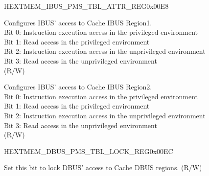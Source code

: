 \begin{register}{H}{EXTMEM\_IBUS\_PMS\_TBL\_ATTR\_REG}{0x00E8}\label{regdesc:EXTMEMIBUSPMSTBLATTRREG}
%
%
%
\regnewline%
\begin{regdesc}\begin{reglist}
\label{fielddesc:EXTMEMIBUSPMSSCT1ATTR}\item [EXTMEM\_IBUS\_PMS\_SCT1\_ATTR] Configures IBUS' access to Cache IBUS Region1. \\
Bit 0: Instruction execution access in the privileged environment\\
Bit 1: Read access in the privileged environment\\
Bit 2: Instruction execution access in the unprivileged environment\\
Bit 3: Read access in the unprivileged environment\\
(R/W)
\label{fielddesc:EXTMEMIBUSPMSSCT2ATTR}\item [EXTMEM\_IBUS\_PMS\_SCT2\_ATTR] Configures IBUS' access to Cache IBUS Region2. \\
Bit 0: Instruction execution access in the privileged environment\\
Bit 1: Read access in the privileged environment\\
Bit 2: Instruction execution access in the unprivileged environment\\
Bit 3: Read access in the unprivileged environment\\
(R/W)
\end{reglist}\end{regdesc}
\end{register}


\begin{register}{H}{EXTMEM\_DBUS\_PMS\_TBL\_LOCK\_REG}{0x00EC}\label{regdesc:EXTMEMDBUSPMSTBLLOCKREG}
%
%
\regnewline%
\begin{regdesc}\begin{reglist}
\label{fielddesc:EXTMEMDBUSPMSLOCK}\item [EXTMEM\_DBUS\_PMS\_LOCK] Set this bit to lock DBUS' access to Cache DBUS regions. (R/W)
\end{reglist}\end{regdesc}
\end{register}


